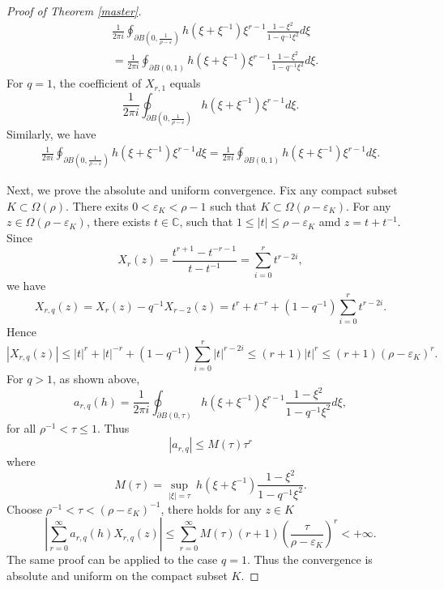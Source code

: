 \documentclass{article}
\begin{document}
\begin{proof}[Proof of Theorem \ref{master}]
$$
\begin{aligned}
    &\frac{1}{2\pi i}\oint_{\partial B(0, \frac{1}{\rho-\varepsilon})} h(\xi+\xi^{-1})\xi^{r-1}\frac{1-\xi^2}{1-q^{-1}\xi^2}d\xi\\
    &=\frac{1}{2\pi i}\oint_{\partial B(0, 1)} h(\xi+\xi^{-1})\xi^{r-1}\frac{1-\xi^2}{1-q^{-1}\xi^2}d\xi.
\end{aligned}
$$
For $q=1$, the coefficient of $X_{r,1}$ equals
$$\frac{1}{2\pi i}\oint_{\partial B(0, \frac{1}{\rho-\varepsilon})} h(\xi+\xi^{-1})\xi^{r-1}d\xi.$$
Similarly, we have 
$$
\begin{aligned}
    \frac{1}{2\pi i}\oint_{\partial B(0, \frac{1}{\rho-\varepsilon})} h(\xi+\xi^{-1})\xi^{r-1}d\xi=\frac{1}{2\pi i}\oint_{\partial B(0, 1)} h(\xi+\xi^{-1})\xi^{r-1}d\xi.
\end{aligned}
$$

Next, we prove the absolute and uniform convergence. Fix any compact subset $K\subset \Omega(\rho)$. There exits $0<\varepsilon_K<\rho-1$ such that $K\subset \Omega(\rho-\varepsilon_K)$. For any $z\in \Omega(\rho-\varepsilon_K)$, there exists $t\in \mathbb{C}$, such that $1\leq |t|\leq \rho-\varepsilon_K$ amd $z=t+t^{-1}$.
Since $$
    X_r(z)=\frac{t^{r+1}-t^{-r-1}}{t-t^{-1}}=\sum_{i=0}^{r}t^{r-2i},
$$
we have 
$$X_{r,q}(z)=X_r(z)-q^{-1}X_{r-2}(z)=t^{r}+t^{-r}+(1-q^{-1})\sum_{i=0}^{r}t^{r-2i}.$$
Hence
$$|X_{r,q}(z)|\leq |t|^{r}+|t|^{-r}+(1-q^{-1})\sum_{i=0}^{r}|t|^{r-2i}\leq (r+1)|t|^{r}\leq (r+1) (\rho-\varepsilon_K)^r.$$
For $q>1$, as shown above,
$$a_{r,q}(h)=\frac{1}{2\pi i}\oint_{\partial B(0, \tau)} h(\xi+\xi^{-1})\xi^{r-1}\frac{1-\xi^2}{1-q^{-1}\xi^2}d\xi,$$
for all $ \rho^{-1}<\tau\leq 1$. Thus 
$$|a_{r,q}|\leq M(\tau) \tau^r$$
where $$M(\tau)=\sup_{|\xi|=\tau}\ h(\xi+\xi^{-1})\frac{1-\xi^2}{1-q^{-1}\xi^2}.$$
Choose $\rho^{-1} <\tau<(\rho-\varepsilon_K)^{-1}$, there holds for any $z\in K$
$$\left|\sum_{r=0}^{\infty} a_{r,q}(h) X_{r,q}(z)\right|\leq \sum_{r=0}^{\infty} M(\tau) (r+1) \left(\frac{\tau}{\rho-\varepsilon_K}\right) ^r<+\infty.$$
The same proof can be applied to the case $q=1$. Thus the convergence is absolute and uniform on the compact subset $K$. 
\end{proof}
\end{document}
